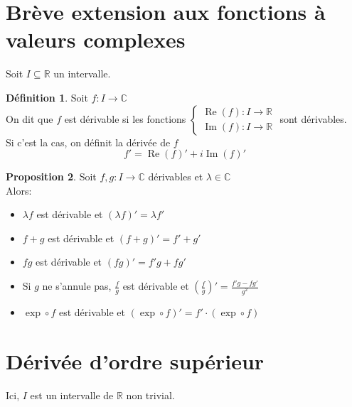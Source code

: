 \documentclass[10pt,a4paper]{article}
\theoremstyle{definition}
\newtheorem{proposition}{Proposition}[section]
\newtheorem{definition}[proposition]{Définition}
\DeclareMathOperator{\re}{Re}
\DeclareMathOperator{\im}{Im}
\begin{document}
\section{Brève extension aux fonctions à valeurs complexes}
Soit $I \subseteq \mathbb{R}$ un intervalle.
\begin{definition}
Soit $f: I \to \mathbb{C}$ \\
On dit que $f$ est dérivable si les fonctions $\begin{cases}
\re(f): I \to \mathbb{R} \\
\im(f): I \to \mathbb{R}
\end{cases}$ sont dérivables. \\
Si c'est la cas, on définit la dérivée de $f$
\[f' = \re(f)' + i \im(f)'\]
\end{definition}

\pagebreak

\begin{proposition}
Soit $f, g: I \to \mathbb{C}$ dérivables et $\lambda \in \mathbb{C}$ \\
Alors:
\begin{itemize}
\item $\lambda f$ est dérivable et $(\lambda f)' = \lambda f'$
\item $f + g$ est dérivable et $(f + g)' = f' + g'$
\item $fg$ est dérivable et $(fg)' = f'g + fg'$
\item Si $g$ ne s'annule pas, $\frac{f}{g}$ est dérivable et $\left(\frac{f}{g}\right)' = \frac{f'g - fg'}{g^2}$
\item $\exp \circ f$ est dérivable et $(\exp \circ f)' = f' \cdot (\exp \circ f)$
\end{itemize}
\end{proposition}

\section{Dérivée d'ordre supérieur}
Ici, $I$ est un intervalle de $\mathbb{R}$ non trivial.
\end{document}
